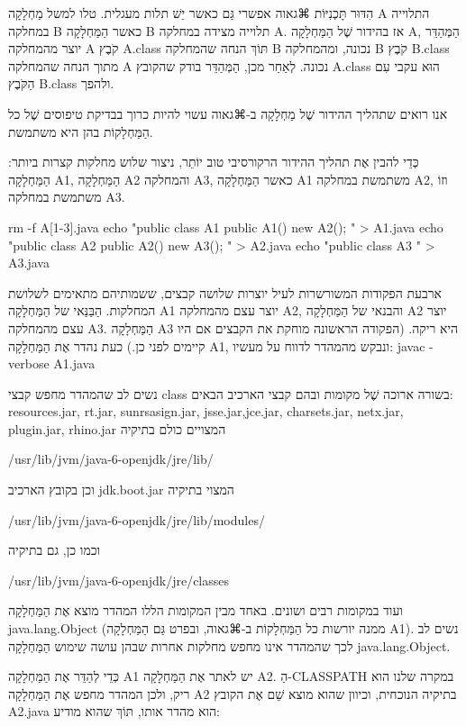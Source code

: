 הִדּוּר תָּכְנִיּוֹת ⌘גאוה אפשרי גַּם כאשר יֵשׁ תלות מעגלית. טלו למשל מַחְלָקָה A
התלוייה במחלקה B כאשר הַמַּחְלָקָה B תלוייה מצידה במחלקה A. אז בהידור שֶׁל
הַמַּחְלָקָה A, הַמְּהַדֵּר יוצר מהמחלקה A קֹבֶץ A.class תּוֹךְ הנחה שהמחלקה B
נכונה, ומהמחלקה B קֹבֶץ B.class מתוך הנחה שהמחלקה A נכונה. לְאַחַר מכן,
הַמְּהַדֵּר בודק שהקובץ A.class הוּא עקבי עִם הַקֹּבֶץ B.class ולהפך.

אנו רואים שתהליך ההידור שֶׁל מַחְלָקָה ב-⌘גאוה עשוי להיות כרוך בבדיקת טיפוסים
שֶׁל כל הַמַּחְלָקוֹת בהן היא משתמשת.

כְּדֵי להבין אֶת תהליך ההידור הרקורסיבי טוב יוֹתֵר, ניצור שלוש מחלקות קצרות
ביותר: הַמַּחְלָקָה A1, הַמַּחְלָקָה A2 והמחלקה A3, כאשר הַמַּחְלָקָה A1 משתמשת
במחלקה A2, וזוֹ משתמשת במחלקה A3.

rm -f A[1-3].java 
echo "public class A1 { public A1() { new A2(); }}" > A1.java 
echo "public class A2 { public A2() { new A3(); }}" > A2.java
echo "public class A3 { }" > A3.java
\END


ארבעת הפקודות המשורשרות לעיל יוצרות שלושה קבצים, ששמותיהם מתאימים לשלושת
המחלקות. הַבַּנַּאי של הַמַּחְלָקָה A1 יוצר עצם מהמחלקה A2, והבנאי של
הַמַּחְלָקָה A2 יוצר עצם מהמחלקה A3. הַמַּחְלָקָה A3 היא ריקה. (הפקודה הראשונה
מוחקת את הקבצים אם היו קיימים לפני כן.)
כעת נהדר אֶת הַמַּחְלָקָה A1, ונבקש מהמהדר לדווח על מעשיו:
javac -verbose A1.java
\END

נשים לב שהמהדר מחפש קבצי class בשורה ארוכה שֶׁל מקומות ובהם קבצי הארכיב הבאים:
resources.jar, rt.jar, sunrsasign.jar, jsse.jar,jce.jar, charsets.jar, netx.jar,
plugin.jar, rhino.jar המצויים כולם בתיקיה

/usr/lib/jvm/java-6-openjdk/jre/lib/

וכן בקובץ הארכיב jdk.boot.jar המצוי בתיקיה

/usr/lib/jvm/java-6-openjdk/jre/lib/modules/


וכמו כן, גם בתיקיה

/usr/lib/jvm/java-6-openjdk/jre/classes

ועוד במקומות רבים ושונים. באחד מבין המקומות הללו המהדר מוצא אֶת הַמַּחְלָקָה
java.lang.Object (ממנה יורשות כל הַמַּחְלָקוֹת ב-⌘גאוה, ובפרט  גַּם הַמַּחְלָקָה
A1). נשים לב לכך שהמהדר אינו מחפש מחלקות אחרות שבהן עושה שימוש הַמַּחְלָקָה
java.lang.Object.

כְּדֵי לְהַדֵּר אֶת הַמַּחְלָקָה A1 יש לאתר אֶת הַמַּחְלָקָה A2. הַ-CLASSPATH
במקרה שלנו הוא ריק, ולכן המהדר מחפש אֶת הַמַּחְלָקָה A2 בתיקיה הנוכחית, וכיוון
שהוא מוצא שֵׁם אֶת הקובץ A2.java הוא מהדר אותו, תּוֹךְ שהוא מודיע:

